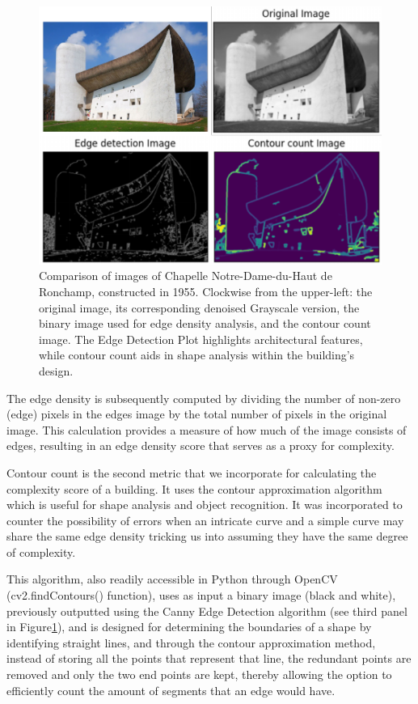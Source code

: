      \begin{figure}[htb]
          \centering
          \includegraphics[width= \linewidth]{Images/ComplexityPlotHistoryCICA}
          \caption{Comparison of images of Chapelle Notre-Dame-du-Haut de Ronchamp, constructed in 1955. Clockwise from the upper-left: the original image, its corresponding denoised Grayscale version, the binary image used for edge density analysis, and the contour count image. The Edge Detection Plot highlights architectural features, while contour count aids in shape analysis within the building's design.}
          \label{fig:ComplexityPlotHistory}
        \end{figure}

The edge density is subsequently computed by dividing the number of non-zero (edge) pixels in the edges image by the total number of pixels in the original image.
This calculation provides a measure of how much of the image consists of edges, resulting in an edge density score that serves as a proxy for complexity.

Contour count is the second metric that we incorporate for calculating the complexity score of a building.
It uses the contour approximation algorithm which is useful for shape analysis and object recognition\cite{ContourOpenCV2023}.
It was incorporated to counter the possibility of errors when an intricate curve and a simple curve may share the same edge density tricking us into assuming they have the same degree of complexity.

This algorithm, also readily accessible in Python through OpenCV (cv2.findContours() function), uses as input a binary image (black and white), previously outputted using the Canny Edge Detection algorithm (see third panel in Figure\ref{fig:ComplexityPlotHistory}), and is designed for determining the boundaries of a shape by identifying straight lines, and through the contour approximation method\cite{ContourOpenCV2023}, instead of storing all the points that represent that line, the redundant points are removed and only the two end points are kept, thereby allowing the option to efficiently count the amount of segments that an edge would have.

